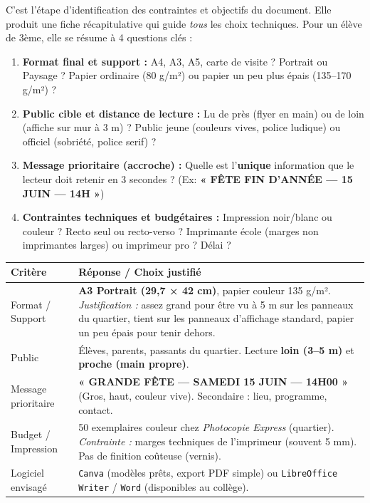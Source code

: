 \documentclass[11pt]{article}
\begin{document}
\begin{definition}
C'est l'étape d'identification des contraintes et objectifs du document. Elle produit une fiche récapitulative qui guide \emph{tous} les choix techniques. Pour un élève de 3ème, elle se résume à 4 questions clés :
\begin{enumerate}
    \item \textbf{Format final et support :} A4, A3, A5, carte de visite ? Portrait ou Paysage ? Papier ordinaire (80 g/m²) ou papier un peu plus épais (135--170 g/m²) ?
    \item \textbf{Public cible et distance de lecture :} Lu de près (flyer en main) ou de loin (affiche sur mur à 3 m) ? Public jeune (couleurs vives, police ludique) ou officiel (sobriété, police serif) ?
    \item \textbf{Message prioritaire (accroche) :} Quelle est l'\textbf{unique} information que le lecteur doit retenir en 3 secondes ? (Ex: \textbf{« FÊTE FIN D'ANNÉE — 15 JUIN — 14H »})
    \item \textbf{Contraintes techniques et budgétaires :} Impression noir/blanc ou couleur ? Recto seul ou recto-verso ? Imprimante école (marges non imprimantes larges) ou imprimeur pro ? Délai ?
\end{enumerate}
\end{definition}

\begin{exemplebox}
\begin{center}
\begin{tabularx}{\linewidth}{|l|X|}
\hline
\textbf{Critère} & \textbf{Réponse / Choix justifié} \\
\hline
Format / Support & \textbf{A3 Portrait (29,7 × 42 cm)}, papier couleur 135 g/m². \textit{Justification :} assez grand pour être vu à 5 m sur les panneaux du quartier, tient sur les panneaux d'affichage standard, papier un peu épais pour tenir dehors. \\
\hline
Public & Élèves, parents, passants du quartier. Lecture \textbf{loin (3--5 m)} et \textbf{proche (main propre)}. \\
\hline
Message prioritaire & \textbf{« GRANDE FÊTE — SAMEDI 15 JUIN — 14H00 »} (Gros, haut, couleur vive). Secondaire : lieu, programme, contact. \\
\hline
Budget / Impression & 50 exemplaires couleur chez \textit{Photocopie Express} (quartier). \textit{Contrainte :} marges techniques de l'imprimeur (souvent 5 mm). Pas de finition coûteuse (vernis). \\
\hline
Logiciel envisagé & \texttt{Canva} (modèles prêts, export PDF simple) ou \texttt{LibreOffice Writer} / \texttt{Word} (disponibles au collège). \\
\hline
\end{tabularx}
\end{center}
\end{exemplebox}
\end{document}
